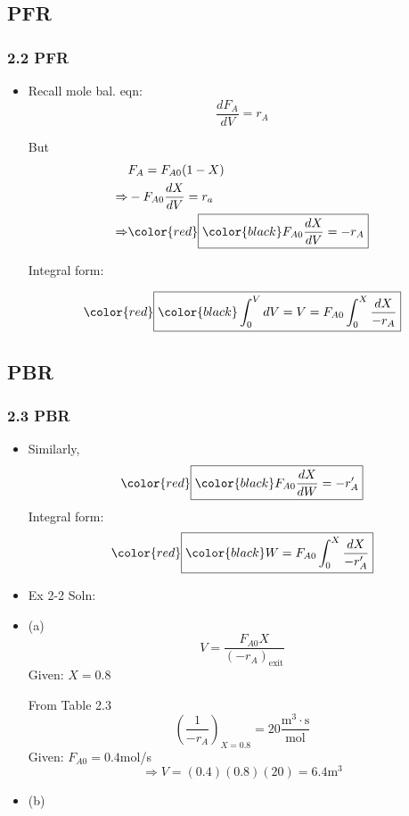 \subsection{PFR}
\begin{frame}\frametitle{2.2 \color{blue}PFR} \vspace{-0.4em}
	\begin{itemize}
		\item	\small Recall mole bal. eqn: $$\frac{dF_A}{dV} = r_A$$

		But
		\begin{align*}
			&F_A = F_{A0}(1 - X)\\
			\Rightarrow&-F_{A0}\frac{dX}{dV} = r_a\\
			\Rightarrow&{\color{red}\boxed{\color{black}F_{A0}\frac{dX}{dV}=-r_A}}
		\end{align*}

		Integral form:

		$${\color{red}\boxed{\color{black}\int_0^VdV = V = F_{A0}\int_0^X\frac{dX}{-r_A}}}$$
	\end{itemize}
\end{frame}

\subsection{PBR}
\begin{frame}\frametitle{2.3 \color{blue}PBR}
	\begin{itemize}
		\item	Similarly, $${\color{red}\boxed{\color{black}F_{A0} \frac{dX}{dW} = -r_A'}}$$ Integral form: $${\color{red}\boxed{\color{black}W = F_{A0}\int_0^X\frac{dX}{-r_A'}}}$$
	\end{itemize}
\end{frame}
\begin{frame}
	\begin{itemize}
		\item	{\color{blue}Ex 2-2} Soln:
		\item	(a) $$V = \frac{F_{A0}X}{(-r_A)_\text{exit}}$$ Given: $X = 0.8$

		From Table 2.3 $$\left(\frac{1}{-r_A}\right)_{X=0.8} = 20 \frac{\text{m}^3\cdot\text{s}}{\text{mol}}$$ Given: $F_{A0} = 0.4$mol/s $$\Rightarrow V = (0.4)(0.8)(20) = 6.4\text{m}^3$$
		\item	(b)
	\end{itemize}
\end{frame}

